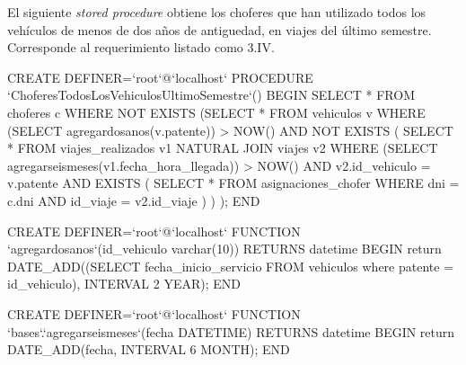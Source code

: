El siguiente \textit{stored procedure} obtiene los choferes que han utilizado todos los veh\'iculos de menos de dos a\~nos 
de antiguedad, en viajes del \'ultimo semestre. Corresponde al requerimiento listado como 3.IV.

\begin{sql}
		
CREATE DEFINER=`root`@`localhost` PROCEDURE  
		`ChoferesTodosLosVehiculosUltimoSemestre`()
BEGIN
		       SELECT *
	       	       FROM choferes c
	       	       WHERE NOT EXISTS
			 (SELECT *
			  FROM vehiculos v
			  WHERE (SELECT agregardosanos(v.patente)) > NOW() AND NOT EXISTS (
				SELECT *
				 FROM viajes_realizados v1
				 NATURAL JOIN viajes v2
				 WHERE (SELECT agregarseismeses(v1.fecha_hora_llegada)) > NOW()
				       AND v2.id_vehiculo = v.patente
				 AND EXISTS (
				      SELECT * FROM asignaciones_chofer WHERE
					 dni = c.dni AND id_viaje = v2.id_viaje
				)      
				) 
			 );
		END
		
		CREATE DEFINER=`root`@`localhost` FUNCTION  
		`agregardosanos`(id_vehiculo varchar(10)) RETURNS datetime
BEGIN
		return DATE_ADD((SELECT fecha_inicio_servicio FROM vehiculos where patente = id_vehiculo), 
						INTERVAL 2 YEAR);
		END
		

		CREATE DEFINER=`root`@`localhost` FUNCTION  `bases`.`agregarseismeses`(fecha DATETIME) 
		RETURNS datetime
BEGIN
		return DATE_ADD(fecha, INTERVAL 6 MONTH);
		END
		
		
\end{sql}

